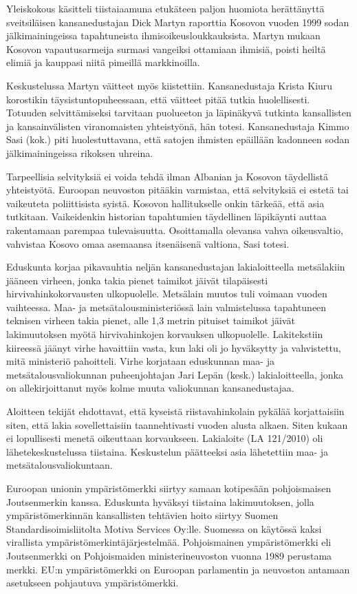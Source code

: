 Yleiskokous käsitteli tiistaiaamuna etukäteen paljon huomiota
herättänyttä sveitsiläisen kansanedustajan Dick Martyn raporttia
Kosovon vuoden 1999 sodan jälkimainingeissa tapahtuneista
ihmisoikeusloukkauksista. Martyn mukaan Kosovon vapautusarmeija
surmasi vangeiksi ottamiaan ihmisiä, poisti heiltä elimiä ja kauppasi
niitä pimeillä markkinoilla.

Keskustelussa Martyn väitteet myös kiistettiin. Kansanedustaja Krista
Kiuru korostikin täysistuntopuheessaan, että väitteet pitää tutkia
huolellisesti.  Totuuden selvittämiseksi tarvitaan puolueeton ja
läpinäkyvä tutkinta kansallisten ja kansainvälisten viranomaisten
yhteistyönä, hän totesi.  Kansanedustaja Kimmo Sasi (kok.) piti
huolestuttavana, että satojen ihmisten epäillään kadonneen sodan
jälkimainingeissa rikoksen uhreina.

Tarpeellisia selvityksiä ei voida tehdä ilman Albanian ja Kosovon
täydellistä yhteistyötä. Euroopan neuvoston pitääkin varmistaa, että
selvityksiä ei estetä tai vaikeuteta poliittisista syistä. Kosovon
hallitukselle onkin tärkeää, että asia tutkitaan. Vaikeidenkin
historian tapahtumien täydellinen läpikäynti auttaa rakentamaan
parempaa tulevaisuutta. Osoittamalla olevansa vahva oikeusvaltio,
vahvistaa Kosovo omaa asemaansa itsenäisenä valtiona, Sasi totesi.

Eduskunta korjaa pikavauhtia neljän kansanedustajan lakialoitteella
metsälakiin jääneen virheen, jonka takia pienet taimikot jäivät
tilapäisesti hirvivahinkokorvausten ulkopuolelle.  Metsälain muutos
tuli voimaan vuoden vaihteessa. Maa- ja metsätalousministeriössä lain
valmistelussa tapahtuneen teknisen virheen takia pienet, alle 1,3
metrin pituiset taimikot jäivät lakimuutoksen myötä hirvivahinkojen
korvauksen ulkopuolelle.  Lakitekstiin kiireessä jäänyt virhe
havaittiin vasta, kun laki oli jo hyväksytty ja vahvistettu, mitä
ministeriö pahoitteli. Virhe korjataan eduskunnan maa- ja
metsätalousvaliokunnan puheenjohtajan Jari Lepän (kesk.)
lakialoitteella, jonka on allekirjoittanut myös kolme muuta
valiokunnan kansanedustajaa.

Aloitteen tekijät ehdottavat, että kyseistä riistavahinkolain pykälää
korjattaisiin siten, että lakia sovellettaisiin taannehtivasti vuoden
alusta alkaen. Siten kukaan ei lopullisesti menetä oikeuttaan
korvaukseen.  Lakialoite (LA 121/2010) oli lähetekeskustelussa
tiistaina. Keskustelun päätteeksi asia lähetettiin maa- ja
metsätalousvaliokuntaan.

Euroopan unionin ympäristömerkki siirtyy samaan kotipesään
pohjoismaisen Joutsenmerkin kanssa. Eduskunta hyväksyi tiistaina
lakimuutoksen, jolla ympäristömerkinnän kansallisten tehtävien hoito
siirtyy Suomen Standardisoimisliitolta Motiva Services Oy:lle.
Suomessa on käytössä kaksi virallista
ympäristömerkintäjärjestelmää. Pohjoismainen ympäristömerkki eli
Joutsenmerkki on Pohjoismaiden ministerineuvoston vuonna 1989
perustama merkki. EU:n ympäristömerkki on Euroopan parlamentin ja
neuvoston antamaan asetukseen pohjautuva ympäristömerkki.

